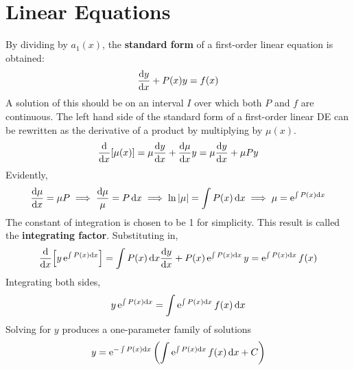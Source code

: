 \documentclass[./Differential Equations.tex]{subfiles}
\begin{document}
	\section{Linear Equations}
			By dividing by \(a_1(x)\), the \textbf{standard form} of a first-order linear equation is obtained:
				\[\dv{y}{x} + P(x)y = f(x)\]
				A solution of this should be on an interval \(I\) over which both \(P\) and \(f\) are continuous.
			The left hand side of the standard form of a first-order linear DE can be rewritten as the derivative of a product by multiplying by \(\mu(x)\).
			\[\dv{}{x}[\mu(x)] = \mu\dv{y}{x} + \dv{\mu}{x}y = \mu\dv{y}{x} + \mu Py\]
			Evidently,
			\[
				\dv{\mu}{x} = \mu P \implies 
					\frac{\dd{\mu}}{\mu} = P \dd{x} \implies
					\ln|\mu| = \int P(x)\dd{x} \implies
					\mu = \operatorname{e}^{\int P(x)\dd{x}}
			\]
			The constant of integration is chosen to be 1 for simplicity. This result is called the \textbf{integrating factor}. Substituting in,
			\[
				\dv{}{x}{\Bigl[y\operatorname{e}^{\int P(x)\dd{x}}\Bigr] = \int P(x)\dd{x}}\dv{y}{x} + P(x)\operatorname{e}^{\int P(x)\dd{x}}y = \operatorname{e}^{\int P(x)\dd{x}}f(x)
			\]
			Integrating both sides,
			\[y\operatorname{e}^{\int P(x)\dd{x}} = \int \operatorname{e}^{\int P(x)\dd{x}}f(x)\dd{x}\]
			Solving for \(y\) produces a one-parameter family of solutions
			\[y = \operatorname{e}^{-\int P(x)\dd{x}}\left(\int \operatorname{e}^{\int P(x)\dd{x}}f(x)\dd{x} + C\right)\]
\end{document}
